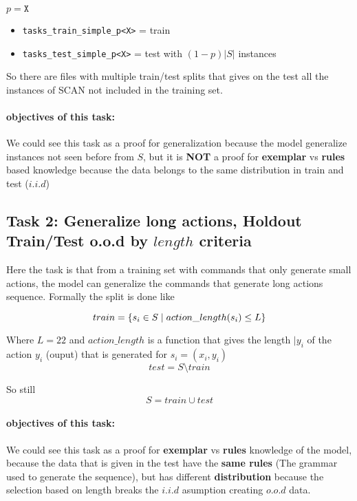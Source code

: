 \documentclass[]{article}
\begin{document}
$p = \texttt{X}$
\begin{itemize}
    \item \texttt{tasks\_train\_simple\_p<X>} = train
    \item \texttt{tasks\_test\_simple\_p<X>} = test with $(1 - p)|S|$ instances
\end{itemize}

So there are files with multiple train/test splits that gives on the test all the instances of SCAN not included in the training set.

\paragraph*{objectives of this task: }
We could see this task as a proof for generalization because the model generalize instances not seen before from $S$, but it is \textbf{NOT} a proof for \textbf{exemplar} vs \textbf{rules} based knowledge because the data belongs to the same distribution in train and test ($i.i.d$)

\subsection{Task 2: Generalize long actions, Holdout Train/Test o.o.d by $length$ criteria}

Here the task is that from a training set with commands that only generate small actions, the model can generalize the commands that generate long actions sequence. Formally the split is done like


\begin{equation}
    train = \{s_i \in S \; | \; action\_length(s_i) \leq L\} \\
\end{equation}

Where $L = 22$ and $action\_length$ is a function that gives the length $|y_i$ of the action $y_i$ (ouput) that is generated for $s_i = (x_i, y_i)$
\begin{equation}
    test = S \setminus train
\end{equation}

So still
\begin{equation}
    S = train \cup test
\end{equation}

\paragraph*{objectives of this task: }
We could see this task as a proof for \textbf{exemplar} vs \textbf{rules} knowledge of the model, because the data that is given in the test have the \textbf{same rules} (The grammar used to generate the sequence), but has different \textbf{distribution} because the selection based on length breaks the $i.i.d$ asumption creating $o.o.d$ data.
\end{document}
